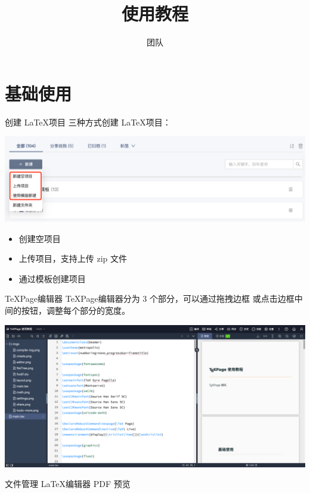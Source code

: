 \documentclass{beamer}
\title{\texpage 使用教程}
\author{\texpage 团队}
\date{}
\DeclareRobustCommand\texpage{\TeX Page}
\newenvironment{display}{\trivlist\item[]}{\endtrivlist}
\begin{document}
\maketitle

\section{基础使用}

\begin{frame}{创建 \LaTeX 项目}
三种方式创建 \LaTeX 项目：

\begin{display}
\includegraphics[width=\textwidth]{imgs/create.png}
\end{display}

\begin{itemize}
\item 创建空项目
\item 上传项目，支持上传 zip 文件
\item 通过模板创建项目
\end{itemize}
\end{frame}


\begin{frame}{\texpage 编辑器}
\texpage 编辑器分为 3 个部分，可以通过拖拽边框
或点击边框中间的按钮，调整每个部分的宽度。

\begin{display}
\includegraphics[width=\textwidth]{imgs/layout.png}
\end{display}

文件管理
\LaTeX 编辑器
PDF 预览

\end{frame}
\end{document}
